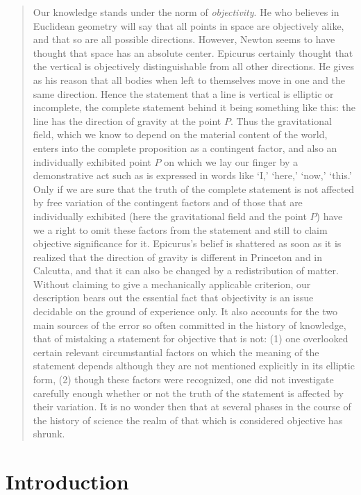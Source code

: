 \begin{quote}
    Our knowledge stands under the norm of \emph{objectivity}.  He who believes in Euclidean geometry will say that all points in space are objectively alike, and that so are all possible directions.  However, Newton seems to have thought that space has an absolute center.  Epicurus certainly thought that the vertical is objectively distinguishable from all other directions.  He gives as his reason that all bodies when left to themselves move in one and the same direction.  Hence the statement that a line is vertical is elliptic or incomplete, the complete statement behind it being something like this: the line has the direction of gravity at the point $P$.  Thus the gravitational field, which we know to depend on the material content of the world, enters into the complete proposition as a contingent factor, and also an individually exhibited point $P$ on which we lay our finger by a demonstrative act such as is expressed in words like `I,' `here,' `now,' `this.'  Only if we are sure that the truth of the complete statement is not affected by free variation of the contingent factors and of those that are individually exhibited (here the gravitational field and the point $P$) have we a right to omit these factors from the statement and still to claim objective significance for it.  Epicurus's belief is shattered as soon as it is realized that the direction of gravity is different in Princeton and in Calcutta, and that it can also be changed by a redistribution of matter.  Without claiming to give a mechanically applicable criterion, our description bears out the essential fact that objectivity is an issue decidable on the ground of experience only.  It also accounts for the two main sources of the error so often committed in the history of knowledge, that of mistaking a statement for objective that is not: (1) one overlooked certain relevant circumstantial factors on which the meaning of the statement depends although they are not mentioned explicitly in its elliptic form, (2) though these factors were recognized, one did not investigate carefully enough whether or not the truth of the statement is affected by their variation.  It is no wonder then that at several phases in the course of the history of science the realm of that which is considered objective has shrunk.  \citep[p. 71-72]{Weyl1949}
\end{quote}

\section{Introduction}

